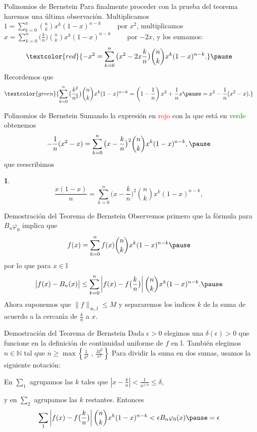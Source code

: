\documentclass[xcolor=dvipsnames,10pt,handout, draft]{beamer}
\newcommand{\nz}{\mathbb N}
\newcommand{\intunit}{\mathbb I}
\newtheorem*{afirma}{}
\begin{document}
\begin{frame}{Polinomios de Bernstein}
Para finalmente proceder con la prueba del teorema haremos una \'ultima observaci\'on.
\vskip5pt\pause
Multiplicamos $\displaystyle1=\sum_{k=0}^n{n\choose k}x^k(1-x)^{n-k}\qquad$ por $x^2$, \pause\vskip4pt  
multiplicamos $\displaystyle x=\sum_{k=0}^n\big(\frac{k}{n}\big){n\choose k}x^{k}(1-x)^{n-k}\qquad$ por $-2x$, \pause\vskip4pt
y los sumamos:
$$\textcolor{red}{-x^2= \sum_{k=0}^n\big(x^2-2x\frac{k}{n}\big){n\choose k}x^{k}(1-x)^{n-k}.}\pause$$
Recordemos que 
$$\textcolor{green}{\sum_{k=0}^n\big(\frac{k^2}{n^2}\big){n\choose k}x^{k}(1-x)^{n-k}=\left(1-\frac{1}{n}\right)x^2+\frac{1}{n}x\pause=x^2-\frac{1}{n}(x^2-x).}$$
\end{frame}


\begin{frame}{Polinomios de Bernstein}
Sumando la expresi\'on en \textcolor{red}{rojo} con la que est\'a en \textcolor{green}{verde} obtenemos
$$-\frac{1}{n}(x^2-x)=\sum_{k=0}^n\big(x-\frac{k}{n}\big)^2{n\choose k}x^{k}(1-x)^{n-k},\pause$$
que reescribimos
\begin{afirma}
$$\frac{x(1-x)}{n}=\sum_{k=0}^n\big(x-\frac{k}{n}\big)^2{n\choose k}x^{k}(1-x)^{n-k},$$
\end{afirma}
\end{frame}


\begin{frame}{Demostraci\'on del Teorema de Bernstein}
Observemos primero que la f\'ormula para $B_n\varphi_0$ implica que 
$$f(x)=\sum_{k=0}^nf(x){n\choose k}x^k(1-x)^{n-k}\pause$$
por lo que para $x\in\intunit$
$$\big|f(x)-B_n(x)\big|\leq\sum_{k=0}^n\left|f(x)-f\big(\frac{k}{n}\big)\right|{n\choose k}x^k(1-x)^{n-k}.\pause$$
Ahora suponemos que $\|f\|_{\infty,\intunit}\leq M$ y separaremos los \'\i ndices $k$ de la suma de acuerdo a la cercan\'\i a de $\displaystyle\frac{k}{n}$ a $x$.
\end{frame}


\begin{frame}{Demostraci\'on del Teorema de Bernstein}
Dada $\epsilon>0$ elegimos una $\delta(\epsilon)>0$ que funcione en la definici\'on de continuidad uniforme de $f$ en $\intunit$.
\pause\vskip5pt
Tambi\'en elegimos $n\in\nz$ tal que $\displaystyle n\geq\max\left\{\frac{1}{\delta^4} \,\,,\,\frac{M^2}{\epsilon^2}\right\}$
\pause\vskip5pt
Para dividir la suma en dos sumas, usamos la siguiente notaci\'on:\pause

En $\displaystyle\sum_1$ agrupamos las $k$ tales que $\displaystyle\left|x-\frac{k}{n}\right|<\frac{1}{n^{1/4}}\leq\delta$,\pause

y en $\displaystyle\sum_2$ agrupamos las $k$ restantes.
\pause\vskip5pt
Entonces 
$$\sum_1\left|f(x)-f\big(\frac{k}{n}\big)\right|{n\choose k}x^k(1-x)^{n-k}<\epsilon B_n\varphi_0(x)\pause=\epsilon$$
\end{frame}
\end{document}
